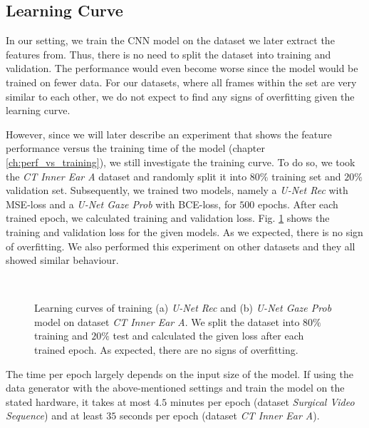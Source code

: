\clearpage
\subsection{Learning Curve} \label{ch:learning_curve}
In our setting, we train the CNN model on the dataset we later extract the features from. Thus, there is no need to split the dataset into training and validation. The performance would even become worse since the model would be trained on fewer data. For our datasets, where all frames within the set are very similar to each other, we do not expect to find any signs of overfitting given the learning curve.

However, since we will later describe an experiment that shows the feature performance versus the training time of the model (chapter \ref{ch:perf_vs_training}), we still investigate the training curve. To do so, we took the \textit{CT Inner Ear A} dataset and randomly split it into $80\%$ training set and $20\%$ validation set. Subsequently, we trained two models, namely a \textit{U-Net Rec} with MSE-loss and a \textit{U-Net Gaze Prob} with BCE-loss, for $500$ epochs. After each trained epoch, we calculated training and validation loss. Fig. \ref{fig:learn_curve} shows the training and validation loss for the given models. As we expected, there is no sign of overfitting. We also performed this experiment on other datasets and they all showed similar behaviour.
\vspace{20pt}

\begin{figure}[!htbp]
  \centering
  \\
  \caption[Model learning curves]{Learning curves of training (a) \textit{U-Net Rec} and (b) \textit{U-Net Gaze Prob} model on dataset \textit{CT Inner Ear A}. We split the dataset into $80\%$ training and $20\%$ test and calculated the given loss after each trained epoch. As expected, there are no signs of overfitting.}
  \label{fig:learn_curve}  
\end{figure}
\vspace{20pt}

The time per epoch largely depends on the input size of the model. If using the data generator with the above-mentioned settings and train the model on the stated hardware, it takes at most $4.5$ minutes per epoch (dataset \textit{Surgical Video Sequence}) and at least $35$ seconds per epoch (dataset \textit{CT Inner Ear A}).

